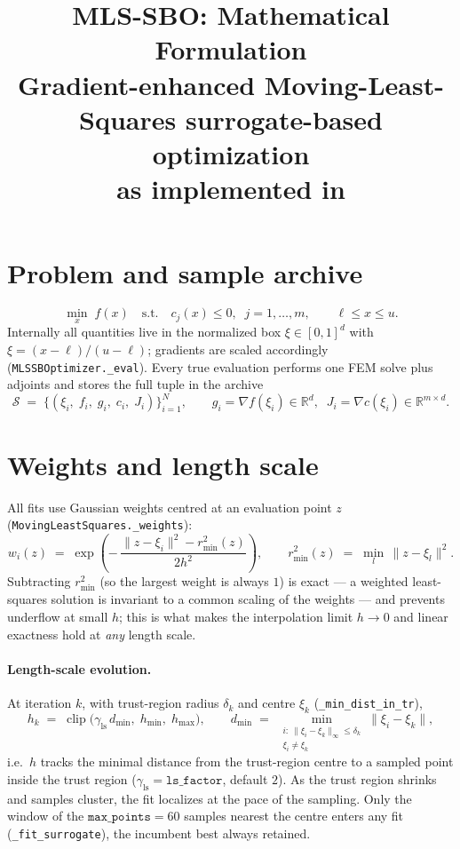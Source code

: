 \documentclass[11pt,a4paper]{article}
\title{MLS-SBO: Mathematical Formulation\\[2pt]
\large Gradient-enhanced Moving-Least-Squares surrogate-based optimization\\
as implemented in \code{scp\_uno/mls\_sbo\_core.py}}
\author{}
\date{}
\newcommand{\code}[1]{\texttt{#1}}
\newcommand{\xxi}{\xi}
\DeclareMathOperator{\clip}{clip}
\begin{document}
\maketitle
\vspace{-3em}

\section{Problem and sample archive}
\begin{equation}
\min_{x} \; f(x) \quad \text{s.t.} \quad c_j(x) \le 0,\;\; j=1,\dots,m,
\qquad \ell \le x \le u .
\end{equation}
Internally all quantities live in the normalized box $\xxi \in [0,1]^d$ with
$\xxi = (x-\ell)/(u-\ell)$; gradients are scaled accordingly
(\code{MLSSBOptimizer.\_eval}). Every true evaluation performs one FEM solve
plus adjoints and stores the full tuple in the archive
\begin{equation}
\mathcal{S} \;=\; \bigl\{(\xxi_i,\; f_i,\; g_i,\; c_i,\; J_i)\bigr\}_{i=1}^{N},
\qquad g_i = \nabla f(\xxi_i) \in \mathbb{R}^d,\;\;
J_i = \nabla c(\xxi_i) \in \mathbb{R}^{m\times d}.
\end{equation}

\section{Weights and length scale}
All fits use Gaussian weights centred at an evaluation point $z$
(\code{MovingLeastSquares.\_weights}):
\begin{equation}
w_i(z) \;=\; \exp\!\left(-\,\frac{\lVert z-\xxi_i\rVert^2 - r_{\min}^2(z)}{2h^2}\right),
\qquad r_{\min}^2(z) \;=\; \min_l\, \lVert z-\xxi_l\rVert^2 .
\label{eq:weights}
\end{equation}
Subtracting $r_{\min}^2$ (so the largest weight is always $1$) is exact --- a
weighted least-squares solution is invariant to a common scaling of the
weights --- and prevents underflow at small $h$; this is what makes the
interpolation limit $h\to 0$ and linear exactness hold at \emph{any} length
scale.

\paragraph{Length-scale evolution.} At iteration $k$, with trust-region
radius $\delta_k$ and centre $\xxi_k$ (\code{\_min\_dist\_in\_tr}),
\begin{equation}
h_k \;=\; \clip\bigl(\gamma_{\mathrm{ls}}\, d_{\min},\; h_{\min},\; h_{\max}\bigr),
\qquad
d_{\min} \;=\; \min_{\substack{i:\ \lVert\xxi_i-\xxi_k\rVert_\infty \le \delta_k\\ \xxi_i \ne \xxi_k}}
\lVert \xxi_i - \xxi_k \rVert ,
\label{eq:lengthscale}
\end{equation}
i.e.\ $h$ tracks the minimal distance from the trust-region centre to a
sampled point inside the trust region ($\gamma_{\mathrm{ls}}=\code{ls\_factor}$,
default $2$). As the trust region shrinks and samples cluster, the fit
localizes at the pace of the sampling. Only the window of the
$\code{max\_points}=60$ samples nearest the centre enters any fit
(\code{\_fit\_surrogate}), the incumbent best always retained.
\end{document}
